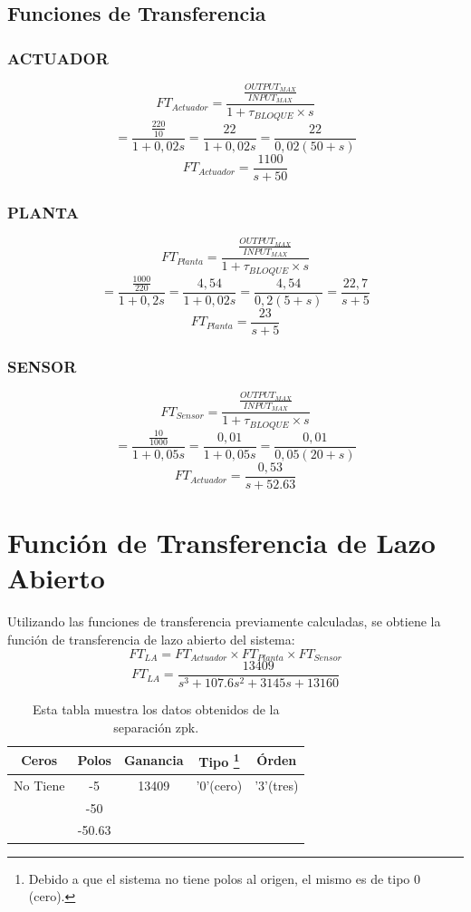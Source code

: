 \documentclass[a4paper,11pt]{article}
\begin{document}
\subsection{Funciones de Transferencia}
\subsubsection{ACTUADOR}
$$FT_{Actuador} =\frac{\frac{OUTPUT_{MAX}}{INPUT_{MAX}}}{1+\tau_{BLOQUE}\times s}$$
$$=\frac{\frac{220}{10}}{1+0,02 s}=\frac{22}{1+0,02 s}=\frac{22}{0,02(50+s)}$$
$$FT_{Actuador} = \frac{1100}{s+50}$$

\subsubsection{PLANTA}
$$FT_{Planta} =\frac{\frac{OUTPUT_{MAX}}{INPUT_{MAX}}}{1+\tau_{BLOQUE}\times s}$$
$$=\frac{\frac{1000}{220}}{1+0,2 s}=\frac{4,54}{1+0,02 s}=\frac{4,54}{0,2(5+s)}= \frac{22,7}{s+5}$$
$$FT_{Planta} = \frac{23}{s+5}$$

\subsubsection{SENSOR}
$$FT_{Sensor} =\frac{\frac{OUTPUT_{MAX}}{INPUT_{MAX}}}{1+\tau_{BLOQUE}\times s}$$
$$=\frac{\frac{10}{1000}}{1+0,05 s}=\frac{0,01}{1+0,05 s}=\frac{0,01}{0,05(20+s)}$$
$$FT_{Actuador} = \frac{0,53}{s+52.63}$$

\section{Función de Transferencia de Lazo Abierto}
Utilizando las funciones de transferencia previamente calculadas, se obtiene la función de transferencia de lazo abierto del sistema:
$$FT_{LA}=FT_{Actuador}  \times FT_{Planta} \times FT_{Sensor} $$
$$FT_{LA}=\frac{13409}{s^3 + 107.6 s^2 + 3145 s + 13160}$$
\begin{table}[h!]
\centering
\caption{Esta tabla muestra los datos obtenidos de la separación zpk.}
\begin{tabular}{|ccccc|}
\hline 
Ceros & Polos & Ganancia & Tipo \footnote{Debido a que el sistema no tiene polos al origen, el mismo es de tipo 0 (cero).} & Órden \tabularnewline
\hline 
\hline 
 No Tiene & -5 & 13409 & '0'(cero) & '3'(tres) \tabularnewline
 & -50 & & &\tabularnewline
 & -50.63 & & &\tabularnewline
\hline 
\end{tabular}
\end{table}
\end{document}
